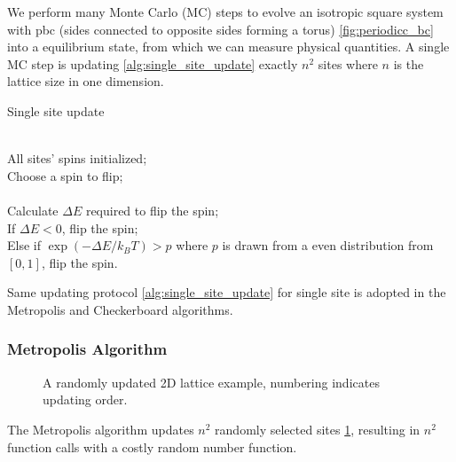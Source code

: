 \documentclass[%
showkeys,
bibnotes,
amsmath,amssymb,
floatfix,
]{revtex4-1}
\begin{document}
We perform many Monte Carlo (MC) steps to evolve an isotropic square system with pbc (sides connected to opposite sides forming a torus) \ref{fig:periodicc_bc} into a equilibrium state, from which we can measure physical quantities. A single MC step is updating \ref{alg:single_site_update} exactly $n^{2}$ sites where $n$ is the lattice size in one dimension.

\begin{algorithm}[H]
	\caption{Single site update}
	\label{alg:single_site_update}
	\begin{algorithmic}
		\REQUIRE ~~\\
		
		All sites' spins initialized;\\
		\label{code:single_site_update:initialization}
		Choose a spin to flip;\\
		
		\ENSURE ~~\\
		Calculate $\Delta E$ required to flip the spin;\\
		\label{code:single_site_update:flipping_energy}
		If $\Delta E < 0$, flip the spin;\\
		Else if $\exp(- \Delta E/k_{B}T) > p$ where $p$ is drawn from a even distribution from $[0,1]$, flip the spin.
		\label{code:equi_detect:size_difference}
	\end{algorithmic}
\end{algorithm}

Same updating protocol \ref{alg:single_site_update} for single site is adopted in the Metropolis and Checkerboard algorithms.

\subsubsection{\label{sec:mc:metro}Metropolis Algorithm}


\begin{figure}[H] \centering
	\caption{\label{fig:metropolis} A randomly updated 2D lattice example, numbering indicates updating order.}
\end{figure}

The Metropolis algorithm \cite{Buscher2020} updates $n^2$ randomly selected sites \ref{fig:metropolis}, resulting in $n^{2}$ function calls with a costly random number function.
\end{document}
